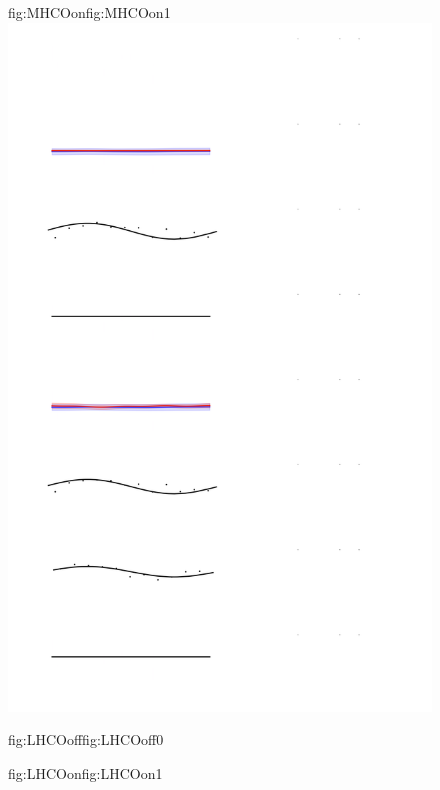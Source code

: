 \begin{figure}
\begin{ocg}{fig:MHCOon}{fig:MHCOon}{1}
  \includegraphics[width=0.8\hsize]{figures/analysisHCoverlap_models.png}%
  \end{ocg}
  \hspace{-0.8\hsize}%
  \begin{ocg}{fig:LHCOoff}{fig:LHCOoff}{0}%
  \end{ocg}%
  \begin{ocg}{fig:LHCOon}{fig:LHCOon}{1}%

\end{ocg}
\end{figure}
